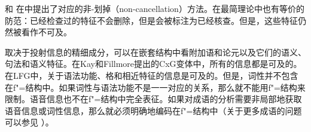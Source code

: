  \citet[]{Higginbotham85a}和 \citet{Winkler97a}在\gbtc 中提出了对应的非-划掉（non-cancellation）方法。在最简理论中也有等价的防范：已经检查过的特征不会删除，但是会被标注为已经核查\citep[]{Stabler2010b}。但是，这些特征仍然被看作不可及。\label{page-non-cancellation-end}

取决于投射信息的精细成分，可以在嵌套结构中看附加语和论元以及它们的语义、句法和语义特征。在Kay和Fillmore提出的CxG变体中，所有的信息都是可及的。在LFG中，关于语法功能、格和相近特征的信息是可及的。但是，词性并不包含在f"=结构中。如果词性与语法功能不是一一对应的关系，那么就不能用f"=结构来限制。语音信息也不在f"=结构中完全表征。如果对成语的分析需要非局部地获取语音信息或词性信息，那么就必须明确地编码在f"=结构中（关于更多成语的问题可以参见 ）。

